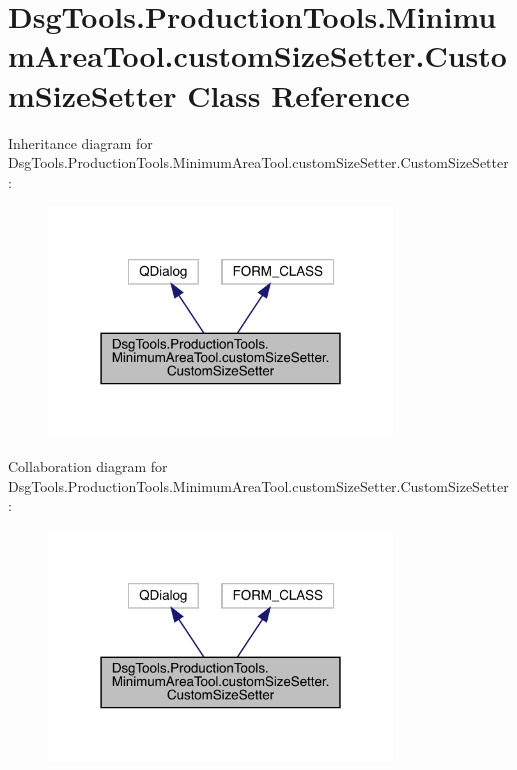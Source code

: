 \hypertarget{class_dsg_tools_1_1_production_tools_1_1_minimum_area_tool_1_1custom_size_setter_1_1_custom_size_setter}{}\section{Dsg\+Tools.\+Production\+Tools.\+Minimum\+Area\+Tool.\+custom\+Size\+Setter.\+Custom\+Size\+Setter Class Reference}
\label{class_dsg_tools_1_1_production_tools_1_1_minimum_area_tool_1_1custom_size_setter_1_1_custom_size_setter}


Inheritance diagram for Dsg\+Tools.\+Production\+Tools.\+Minimum\+Area\+Tool.\+custom\+Size\+Setter.\+Custom\+Size\+Setter\+:
\nopagebreak
\begin{figure}[H]
\begin{center}
\leavevmode
\includegraphics[width=259pt]{class_dsg_tools_1_1_production_tools_1_1_minimum_area_tool_1_1custom_size_setter_1_1_custom_size_setter__inherit__graph}
\end{center}
\end{figure}


Collaboration diagram for Dsg\+Tools.\+Production\+Tools.\+Minimum\+Area\+Tool.\+custom\+Size\+Setter.\+Custom\+Size\+Setter\+:
\nopagebreak
\begin{figure}[H]
\begin{center}
\leavevmode
\includegraphics[width=259pt]{class_dsg_tools_1_1_production_tools_1_1_minimum_area_tool_1_1custom_size_setter_1_1_custom_size_setter__coll__graph}
\end{center}
\end{figure}
